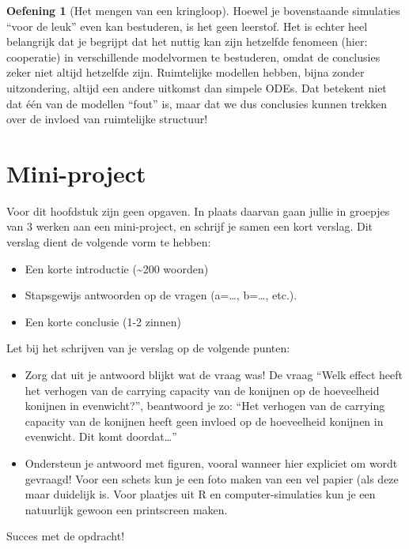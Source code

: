 \documentclass[
  a4paper,
]{scrbook}
\providecommand{\tightlist}{%
  \setlength{\itemsep}{0pt}\setlength{\parskip}{0pt}}\usepackage{longtable,booktabs,array}
\theoremstyle{definition}
\newtheorem{exercise}{Oefening}[chapter]
\theoremstyle{remark}
\begin{document}
\begin{exercise}[Het mengen van een
kringloop]
Hoewel je bovenstaande simulaties ``voor de leuk'' even kan bestuderen,
is het geen leerstof. Het is echter heel belangrijk dat je begrijpt dat
het nuttig kan zijn hetzelfde fenomeen (hier: cooperatie) in
verschillende modelvormen te bestuderen, omdat de conclusies zeker niet
altijd hetzelfde zijn. Ruimtelijke modellen hebben, bijna zonder
uitzondering, altijd een andere uitkomst dan simpele ODEs. Dat betekent
niet dat één van de modellen ``fout'' is, maar dat we dus conclusies
kunnen trekken over de invloed van ruimtelijke structuur!

\section{Mini-project}\label{mini-project}

Voor dit hoofdstuk zijn geen opgaven. In plaats daarvan gaan jullie in
groepjes van 3 werken aan een mini-project, en schrijf je samen een kort
verslag. Dit verslag dient de volgende vorm te hebben:

\begin{itemize}
\tightlist
\item
  Een korte introductie (\textasciitilde200 woorden)
\item
  Stapsgewijs antwoorden op de vragen (a=\ldots, b=\ldots, etc.).
\item
  Een korte conclusie (1-2 zinnen)
\end{itemize}

Let bij het schrijven van je verslag op de volgende punten:

\begin{itemize}
\tightlist
\item
  Zorg dat uit je antwoord blijkt wat de vraag was! De vraag ``Welk
  effect heeft het verhogen van de carrying capacity van de konijnen op
  de hoeveelheid konijnen in evenwicht?'', beantwoord je zo: ``Het
  verhogen van de carrying capacity van de konijnen heeft geen invloed
  op de hoeveelheid konijnen in evenwicht. Dit komt doordat\ldots{}''
\item
  Ondersteun je antwoord met figuren, vooral wanneer hier expliciet om
  wordt gevraagd! Voor een schets kun je een foto maken van een vel
  papier (als deze maar duidelijk is. Voor plaatjes uit R en
  computer-simulaties kun je een natuurlijk gewoon een printscreen
  maken.
\end{itemize}

Succes met de opdracht!

\begin{tcolorbox}[enhanced jigsaw, rightrule=.15mm, opacityback=0, leftrule=.75mm, title=\textcolor{quarto-callout-caution-color}{\faFire}\hspace{0.5em}{Computerpracticum over toxine-productie}, toptitle=1mm, titlerule=0mm, opacitybacktitle=0.6, colframe=quarto-callout-caution-color-frame, breakable, colbacktitle=quarto-callout-caution-color!10!white, coltitle=black, toprule=.15mm, bottomrule=.15mm, left=2mm, bottomtitle=1mm, arc=.35mm, colback=white]


\end{tcolorbox}
\end{exercise}
\end{document}
